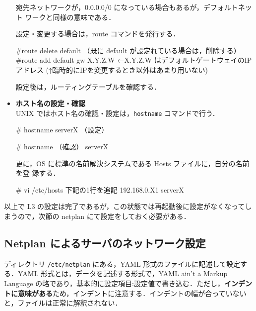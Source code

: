 \begin{itemize}
宛先ネットワークが，0.0.0.0/0 になっている場合もあるが，デフォルトネット
     ワークと同様の意味である．

設定・変更する場合は，route コマンドを発行する．
\begin{cli}
#route delete default （既に default が設定れている場合は，削除する）
#route add default gw X.Y.Z.W  ←X.Y.Z.W はデフォルトゲートウェイのIPアドレス
(↑臨時的にIPを変更するとき以外はあまり用いない)
\end{cli}

設定後は，ルーティングテーブルを確認する．

\item{\bf ホスト名の設定・確認}\\
UNIX ではホスト名の確認・設定は，\texttt{hostname} コマンドで行う．
\begin{cli}
# hostname serverX  （設定）
\end{cli}
\begin{cli}
# hostname  （確認）
serverX
\end{cli}

更に，OS に標準の名前解決システムである Hosts ファイルに，自分の名前を登
録する．

\begin{cli}
# vi /etc/hosts
 下記の1行を追記
192.168.0.X1            serverX

\end{cli}

\end{itemize}

以上で L3 の設定は完了であるが，この状態では再起動後に設定がなくなってし
まうので，次節の netplan にて設定をしておく必要がある．

\subsection{Netplan によるサーバのネットワーク設定}

ディレクトリ \texttt{/etc/netplan} にある，YAML 形式のファイルに記述して設定する．YAML 形式とは，データを記述する形式で，YAML ain't a Markup Language の略であり，基本的に設定項目:設定値で書き込む．ただし，\textbf{インデントに意味がある}ため，インデントに注意する．インデントの幅が合っていないと，ファイルは正常に解釈されない．

